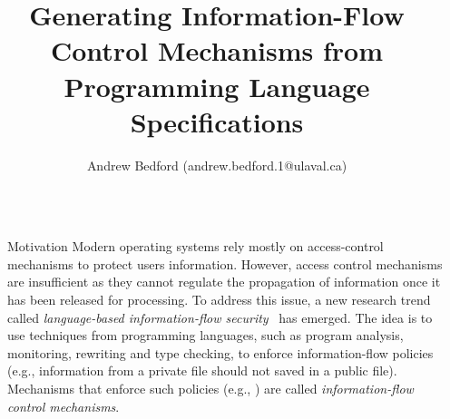 \documentclass[final]{beamer}
\title{Generating Information-Flow Control Mechanisms from Programming Language Specifications} %
\author{Andrew Bedford (andrew.bedford.1@ulaval.ca)} %
\institute{Laval University, Canada} %
\newlength{\sepwid}
\newlength{\onecolwid}
\begin{document}

\setlength{\belowcaptionskip}{2ex} %
\setlength\belowdisplayshortskip{2ex} %

\begin{frame}[fragile] %

\begin{columns}[t] %

\begin{column}{\sepwid}\end{column} %

\begin{column}{\onecolwid} %



\begin{block}{Motivation}
    Modern operating systems rely mostly on access-control mechanisms to protect users information. However, access control mechanisms are insufficient as they cannot regulate the propagation of information once it has been released for processing. To address this issue, a new research trend called \emph{language-based information-flow security}~\cite{DBLP:journals/jsac/SabelfeldM03} has emerged. The idea is to use techniques from programming languages, such as program analysis, monitoring, rewriting and type checking, to enforce information-flow policies (e.g., information from a private file should not saved in a public file). Mechanisms that enforce such policies (e.g., \cite{DBLP:journals/jcs/VolpanoIS96, DBLP:conf/csfw/ChudnovN10, DBLP:conf/csfw/AskarovCM15, DBLP:journals/compsec/BedfordCDKT17}) are called \emph{information-flow control mechanisms}. 
\end{block}


\end{column}
\end{columns}
\end{frame}
\end{document}
